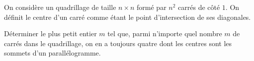 \documentclass[varwidth]{standalone}
\begin{document}
    On consid\`ere un quadrillage de taille $n \times n$ form\'e par $n^2$ carr\'es de c\^ot\'e $1$. On d\'efinit le centre d'un carr\'e comme \'etant le point d'intersection de ses diagonales.

    D\'eterminer le plus petit entier $m$ tel que, parmi n'importe quel nombre $m$ de carr\'es dans le quadrillage, on en a toujours quatre dont les centres sont les sommets d'un parall\'elogramme.
\end{document}
